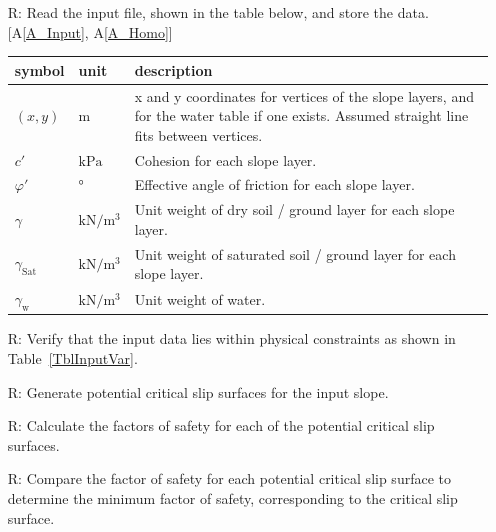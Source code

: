 \documentclass[12pt]{article}
\newcommand{\aref}[1]{A\ref{#1}}
\renewcommand{\arraystretch}{1}
\newcounter{reqnum} %
\newcounter{tablenum} %
\begin{document}
\noindent \begin{itemize}

\item[R\refstepcounter{reqnum}\thereqnum \label{R_Inputs}:] Read the
  input file, shown in the table below, and store the data. [\aref{A_Input}, 
  \aref{A_Homo}]
  
  \renewcommand{\arraystretch}{1.5}
  \noindent \begin{longtable}{l l p{12cm}} \toprule \textbf{symbol} &
    {tablenum}  \label{Table:Inputs}
    \textbf{unit} & \textbf{description}\\ \midrule
    $\left(x,y\right)$ & $\text{m}$ & x and y coordinates for vertices
    of the slope layers, and for the water table if one exists.
    Assumed straight line fits between vertices.\\
    $c'$ & $\text{kPa}$ & Cohesion for each slope layer. \\
    $\varphi'$ & \si{\degree} & Effective angle of friction for each
    slope layer. \\
    $\gamma$ & $\si{\kilo\newton\per\meter\cubed}$ & Unit weight of dry
    soil / ground layer for each slope layer. \\
    $\gamma_{\text{Sat}}$ & $\si{\kilo\newton\per\meter\cubed}$ & Unit
    weight of saturated soil / ground layer for each slope
    layer. \\
    $\gamma_{\text{w}}$ & $\si{\kilo\newton\per\meter\cubed}$ & Unit
    weight of water. \\ \bottomrule
\end{longtable}

\item[R\refstepcounter{reqnum}\thereqnum \label{R_KinAdm}:] Verify that the 
input data lies within physical constraints as shown in 
Table~\ref{TblInputVar}.

\item[R\refstepcounter{reqnum}\thereqnum \label{R_InitGen}:] Generate
potential critical slip surfaces for the input slope. 

\item[R\refstepcounter{reqnum}\thereqnum \label{R_FS}:] Calculate the
  factors of safety for each of the potential critical slip surfaces.

\item[R\refstepcounter{reqnum}\thereqnum \label{R_Minimize}:] Compare the 
factor of safety for each potential critical slip surface to determine the 
minimum factor of safety, corresponding to the critical slip surface.


\end{itemize}
\end{document}
